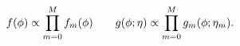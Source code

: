 \begin{equation}
  f(\phi) \propto 
    \prod_{m = 0}^{M} f_{m}(\phi)
  \qquad
  g(\phi; \eta) \propto
    \prod_{m = 0}^{M} g_{m}(\phi; \eta_{m}).
  \label{eqn:factorisations-ep}
\end{equation}